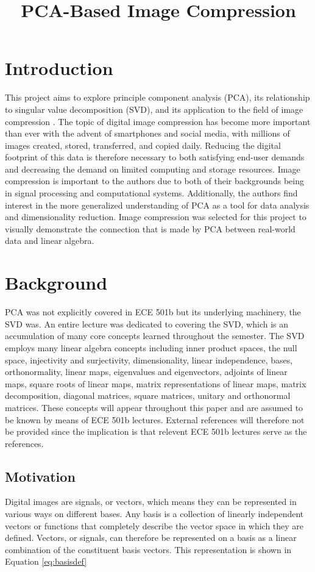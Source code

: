 \documentclass[conference]{IEEEtran}
\title{PCA-Based Image Compression}
\author{
\IEEEauthorblockN{Owen Sowatzke}
\IEEEauthorblockA{\textit{Electrical Engineering Department} \\
\textit{University of Arizona}\\
Tucson, USA \\
osowatzke@arizona.edu}
\and
\IEEEauthorblockN{Scott Thoesen}
\IEEEauthorblockA{\textit{Electrical Engineering Department} \\
\textit{University of Arizona}\\
Tucson, USA \\
thoesens@arizona.edu}}
\begin{document}
    \maketitle
		
    \section{Introduction}
    This project aims to explore principle component analysis (PCA), its relationship to singular value decomposition (SVD), and its application to the field of image compression \cite{jaradet_svd_image_compression}. The topic of digital image compression has become more important than ever with the advent of smartphones and social media, with millions of images created, stored, transferred, and copied daily. Reducing the digital footprint of this data is therefore necessary to both satisfying end-user demands and decreasing the demand on limited computing and storage resources. Image compression is important to the authors due to both of their backgrounds being in signal processing and computational systems. Additionally, the authors find interest in the more generalized understanding of PCA as a tool for data analysis and dimensionality reduction. Image compression was selected for this project to visually demonstrate the connection that is made by PCA between real-world data and linear algebra.

    \section{Background}
    PCA was not explicitly covered in ECE 501b but its underlying machinery, the SVD was. An entire lecture was dedicated to covering the SVD, which is an accumulation of many core concepts learned throughout the semester. The SVD employs many linear algebra concepts including inner product spaces, the null space, injectivity and surjectivity, dimensionality, linear independence, bases, orthonormality, linear maps, eigenvalues and eigenvectors, adjoints of linear maps, square roots of linear maps, matrix representations of linear maps, matrix decomposition, diagonal matrices, square matrices, unitary and orthonormal matrices. These concepts will appear throughout this paper and are assumed to be known by means of ECE 501b lectures. External references will therefore not be provided since the implication is that relevent ECE 501b lectures serve as the references.

    \subsection{Motivation}
    Digital images are signals, or vectors, which means they can be represented in various ways on different bases. Any basis is a collection of linearly independent vectors or functions that completely describe the vector space in which they are defined. Vectors, or signals, can therefore be represented on a basis as a linear combination of the constituent basis vectors. This representation is shown in Equation \ref{eq:basisdef}
\end{document}
